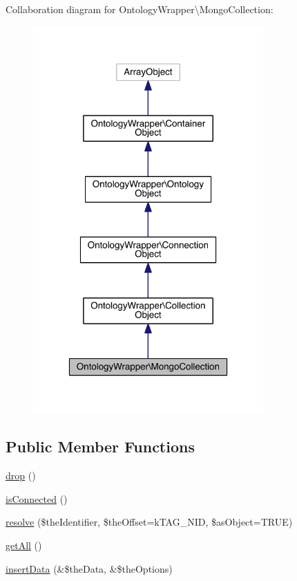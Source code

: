 Collaboration diagram for Ontology\-Wrapper\textbackslash{}Mongo\-Collection\-:\nopagebreak
\begin{figure}[H]
\begin{center}
\leavevmode
\includegraphics[width=250pt]{class_ontology_wrapper_1_1_mongo_collection__coll__graph}
\end{center}
\end{figure}
\subsection*{Public Member Functions}
\begin{DoxyCompactItemize}
\item 
\hyperlink{class_ontology_wrapper_1_1_mongo_collection_aeee231e29de0e8767d85164a7e833c44}{drop} ()
\item 
\hyperlink{class_ontology_wrapper_1_1_mongo_collection_a560202c9b4f73c72f0ed80729308aa58}{is\-Connected} ()
\item 
\hyperlink{class_ontology_wrapper_1_1_mongo_collection_a60a5da13657f31f20ca01561d21404f4}{resolve} (\$the\-Identifier, \$the\-Offset=k\-T\-A\-G\-\_\-\-N\-I\-D, \$as\-Object=T\-R\-U\-E)
\item 
\hyperlink{class_ontology_wrapper_1_1_mongo_collection_a230bf677670eb7f19cd8a01d15f96d15}{get\-All} ()
\item 
\hyperlink{class_ontology_wrapper_1_1_mongo_collection_aea1c5282361f10158efbb23319e53d03}{insert\-Data} (\&\$the\-Data, \&\$the\-Options)
\end{DoxyCompactItemize}
